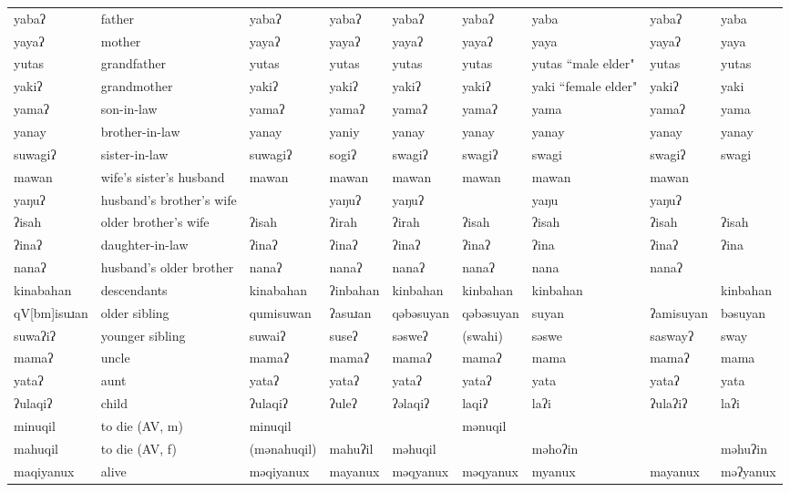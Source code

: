 \begin{landscape}
\begin{longtable}{*{9}{p{}}}
\text{*}yabaʔ & father & yabaʔ & yabaʔ & yabaʔ & yabaʔ & yaba & yabaʔ & yaba\\
\text{*}yayaʔ & mother & yayaʔ & yayaʔ & yayaʔ & yayaʔ & yaya & yayaʔ & yaya\\
\text{*}yutas & grandfather & yutas & yutas & yutas & yutas & yutas ``male elder" & yutas & yutas\\
\text{*}yakiʔ & grandmother & yakiʔ & yakiʔ & yakiʔ & yakiʔ & yaki ``female elder" & yakiʔ & yaki\\
\text{*}yamaʔ & son-in-law & yamaʔ & yamaʔ & yamaʔ & yamaʔ & yama & yamaʔ & yama\\
\text{*}yanay & brother-in-law & yanay & yaniy & yanay & yanay & yanay & yanay & yanay\\
\text{*}suwagiʔ & sister-in-law & suwagiʔ & sogiʔ & swagiʔ & swagiʔ & swagi & swagiʔ & swagi\\
\text{*}mawan & wife's sister's husband & mawan & mawan & mawan & mawan & mawan & mawan & \\
\text{*}yaŋuʔ & husband's brother's wife &  & yaŋuʔ & yaŋuʔ &  & yaŋu & yaŋuʔ & \\
\text{*}ʔisah & older brother's wife & ʔisah & ʔirah & ʔirah & ʔisah & ʔisah & ʔisah & ʔisah\\
\text{*}ʔinaʔ & daughter-in-law & ʔinaʔ & ʔinaʔ & ʔinaʔ & ʔinaʔ & ʔina & ʔinaʔ & ʔina\\
\text{*}nanaʔ & husband's older brother & nanaʔ & nanaʔ & nanaʔ & nanaʔ & nana & nanaʔ & \\
\text{*}kinabahan & descendants & kinabahan & ʔinbahan & kinbahan & kinbahan & kinbahan &  & kinbahan\\
\text{*}qV[bm]isuɹan & older sibling & qumisuwan & ʔasuɹan & qəbəsuyan & qəbəsuyan & suyan & ʔamisuyan & bəsuyan\\
\text{*}suwaʔiʔ & younger sibling & suwaiʔ & suseʔ & səsweʔ & (swahi) & səswe & saswayʔ & sway\\
\text{*}mamaʔ & uncle & mamaʔ & mamaʔ & mamaʔ & mamaʔ & mama & mamaʔ & mama\\
\text{*}yataʔ & aunt & yataʔ & yataʔ & yataʔ & yataʔ & yata & yataʔ & yata\\
\text{*}ʔulaqiʔ & child & ʔulaqiʔ & ʔuleʔ & ʔəlaqiʔ & laqiʔ & laʔi & ʔulaʔiʔ & laʔi\\
\text{*}minuqil & to die (AV, m) & minuqil &  &  & mənuqil &  &  & \\
\text{*}mahuqil & to die (AV, f) & (mənahuqil) & mahuʔil & məhuqil &  & məhoʔin &  & məhuʔin\\
\text{*}maqiyanux & alive & məqiyanux & mayanux & məqyanux & məqyanux & myanux & mayanux & məʔyanux\\

\end{longtable}
\end{landscape}
